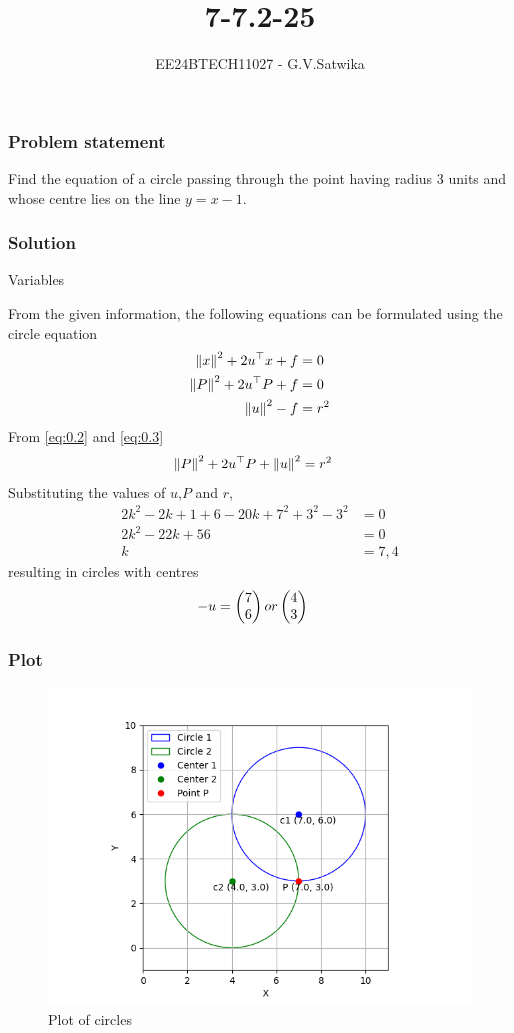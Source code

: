 \documentclass{beamer}
\begin{document}
\title{7-7.2-25}
\author{EE24BTECH11027 - G.V.Satwika}
\date{}
\frame{\titlepage}

\begin{frame}
\frametitle{Problem statement}
Find the equation of a circle passing through the point  having radius 3 units and whose centre lies on the line $y=x-1$.\\
\end{frame}

\begin{frame}[allowframebreaks]
\frametitle{Solution}
\begin{table}[htbp]
	\centering
	\def\arraystretch{1.5}
	
	\caption{Variables}
	\label{tab:variables}
\end{table}
From the given information, the following equations can be formulated using the circle equation 
\begin{align}
	\left\lVert x\right\rVert^2 + 2u^\top x + f &= 0\\
	\left\lVert P\right\rVert^2 + 2u^\top P + f &= 0\label{eq:0.2}\\ 
	\left\lVert u\right\rVert^2 - f &= r^2\label{eq:0.3}
\end{align}
From \eqref{eq:0.2} and \eqref{eq:0.3}
\begin{align}
	\left\lVert P\right\rVert^2 + 2u^\top P + \left\lVert u\right\rVert^2 &= r^2 	
\end{align}
Substituting the values of $u$,$P$ and $r$,
\begin{align}
	2k^2-2k+1+6-20k+7^2+3^2-3^2 &=0 \\
	2k^2-22k+56 &=0 \\
	k &=7,4
\end{align}
resulting in circles with centres 
\begin{align}
	-u&=\begin{pmatrix}7\\6\end{pmatrix} or \begin{pmatrix}4\\3\end{pmatrix}	
\end{align}
\end{frame}
\begin{frame}
\frametitle{Plot}
\begin{figure}[htbp]
	\includegraphics[width=0.75\columnwidth]{figs/circle_plot.png}
	\caption{Plot of circles}
	\label{fig:bode}
\end{figure}
\end{frame}
\end{document}
